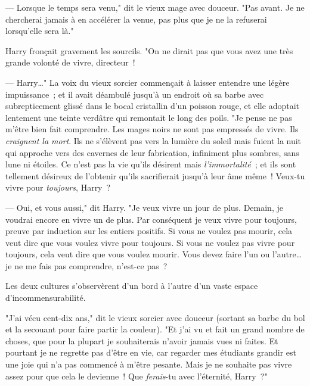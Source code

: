 --- Lorsque le temps sera venu," dit le vieux mage avec douceur. "Pas avant. Je ne chercherai jamais à en accélérer la venue, pas plus que je ne la refuserai lorsqu'elle sera là."

Harry fronçait gravement les sourcils. "On ne dirait pas que vous avez une très grande volonté de vivre, directeur~!

--- Harry…" La voix du vieux sorcier commençait à laisser entendre une légère impuissance~; et il avait déambulé jusqu'à un endroit où sa barbe avec subrepticement glissé dans le bocal cristallin d'un poisson rouge, et elle adoptait lentement une teinte verdâtre qui remontait le long des poils. "Je pense ne pas m'être bien fait comprendre. Les mages noirs ne sont pas empressés de vivre. Ils \emph{craignent la mort}. Ils ne s'élèvent pas vers la lumière du soleil mais fuient la nuit qui approche vers des cavernes de leur fabrication, infiniment plus sombres, sans lune ni étoiles. Ce n'est pas la vie qu'ils désirent mais \emph{l'immortalité}~; et ils sont tellement désireux de l'obtenir qu'ils sacrifierait jusqu'à leur âme même~! Veux-tu vivre pour \emph{toujours}, Harry~?

--- Oui, et vous aussi," dit Harry. "Je veux vivre un jour de plus. Demain, je voudrai encore en vivre un de plus. Par conséquent je veux vivre pour toujours, preuve par induction sur les entiers positifs. Si vous ne voulez pas mourir, cela veut dire que vous voulez vivre pour toujours. Si vous ne voulez pas vivre pour toujours, cela veut dire que vous voulez mourir. Vous devez faire l'un ou l'autre… je ne me fais pas comprendre, n'est-ce pas~?

Les deux cultures s'observèrent d'un bord à l'autre d'un vaste espace d'incommensurabilité.

"J'ai vécu cent-dix ans," dit le vieux sorcier avec douceur (sortant sa barbe du bol et la secouant pour faire partir la couleur). "Et j'ai vu et fait un grand nombre de choses, que pour la plupart je souhaiterais n'avoir jamais vues ni faites. Et pourtant je ne regrette pas d'être en vie, car regarder mes étudiants grandir est une joie qui n'a pas commencé à m'être pesante. Mais je ne souhaite pas vivre assez pour que cela le devienne~! Que \emph{ferais}-tu avec l'éternité, Harry~?"

